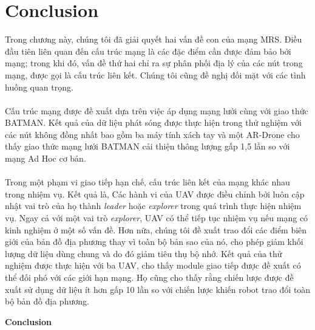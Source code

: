 \documentclass[11pt,openany]{book}
\begin{document}
\section{Conclusion}
Trong chương này, chúng tôi đã giải quyết hai vấn đề con của mạng MRS. Điều đầu tiên liên quan đến cấu trúc mạng là các đặc điểm cần được đảm bảo bởi mạng; trong khi đó, vấn đề thứ hai chỉ ra sự phân phối địa lý của các nút trong mạng, được gọi là cấu trúc liên kết. Chúng tôi cũng đề nghị đối mặt với các tình huống quan trọng.\\\\
Cấu trúc mạng được đề xuất dựa trên việc áp dụng mạng lưới cùng với giao thức BATMAN. Kết quả của dữ liệu phát sóng được thực hiện trong thử nghiệm với các nút không đồng nhất bao gồm ba máy tính xách tay và một AR-Drone cho thấy giao thức mạng lưới BATMAN cải thiện thông lượng gấp 1,5 lần so với mạng Ad Hoc cơ bản.\\\\
Trong một phạm vi giao tiếp hạn chế, cấu trúc liên kết của mạng khác nhau trong nhiệm vụ. Kết quả là, Các hành vi của UAV được điều chỉnh bởi luôn cập nhật vai trò của họ thành \textit{leader} hoặc \textit{explorer} trong quá trình thực hiện nhiệm vụ. Ngay cả với một vai trò \textit{explorer}, UAV có thể tiếp tục nhiệm vụ nếu mạng có kinh nghiệm ở một số vấn đề. Hơn nữa, chúng tôi đề xuất trao đổi các điểm biên giới của bản đồ địa phương thay vì toàn bộ bản sao của nó, cho phép giảm khối lượng dữ liệu dùng chung và do đó giảm tiêu thụ bộ nhớ. Kết quả của thử nghiệm được thực hiện với ba UAV, cho thấy module giao tiếp được đề xuất có thể đối phó với các giới hạn mạng. Họ cũng cho thấy rằng chiến lược được đề xuất sử dụng dữ liệu ít hơn gấp 10 lần so với chiến lược khiến robot trao đổi toàn bộ bản đồ địa phương.
\newpage
\thispagestyle{plain}
\begin{center}
    \Huge
    \textbf{Conclusion}
\end{center}

\printbibliography[heading=bibintoc,title=Tài liệu tham khảo]
\end{document}
